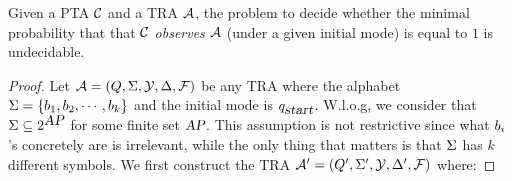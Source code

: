 %
\begin{theorem}
Given a PTA $\mathcal{C}$ and a TRA $\mathcal{A}$, the problem to decide whether the minimal probability that
that $\mathcal{C}$ \emph{observes} $\mathcal{A}$ (under a given initial mode) is equal to $1$ is undecidable.
\end{theorem}
%
\begin{proof}
Let $\mathcal{A}=(Q,\Sigma,\mathcal{Y},\Delta,\mathcal{F})$ be any TRA where the alphabet $\Sigma = \{b_{1}, b_{2}, \cdots, b_{k}\}$ and the initial mode is $q_{\mbox{\sl start}}$.
W.l.o.g, we consider that $\Sigma\subseteq 2^{\mbox{\sl AP}}$ for some finite set $\mbox{\sl AP}$.
This assumption is not restrictive since what $b_{i}$'s concretely are is irrelevant, while the only thing that matters is that $\Sigma$ has $k$ different symbols.
We first construct the TRA $\mathcal{A}' = (Q', \Sigma', \mathcal{Y}, \Delta',\mathcal{F})$ where:


\end{proof}
